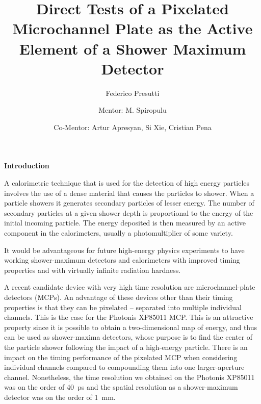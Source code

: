 \documentclass[twocolumn]{article}
\title{Direct Tests of a Pixelated Microchannel Plate as the Active Element of a Shower Maximum Detector}
\author{Federico Presutti
\and Mentor: M. Spiropulu
\and Co-Mentor: Artur Apresyan, Si Xie, Cristian Pena}
\begin{document}



\title{\large}{\textbf{Introduction}}

A calorimetric technique that is used for the detection of high energy particles involves the use of a dense material that causes the particles to shower. When a particle showers it generates secondary particles of lesser energy. The number of secondary particles at a given shower depth is proportional to the energy of the initial incoming particle. The energy deposited is then measured by an active component in the calorimeters, usually a photomultiplier of some variety.

It would be advantageous for future high-energy physics experiments to have working shower-maximum detectors and calorimeters with improved timing properties and with virtually infinite radiation hardness.

A recent candidate device with very high time resolution are microchannel-plate detectors (MCPs). An advantage of these devices other than their timing properties is that they can be pixelated -- separated into multiple individual channels. This is the case for the Photonis XP85011 MCP. This is an attractive property since it is possible to obtain a two-dimensional map of energy, and thus can be used as shower-maxima detectors, whose purpose is to find the center of the particle shower following the impact of a high-energy particle. There is an impact on the timing performance of the pixelated MCP when considering individual channels compared to compounding them into one larger-aperture channel. Nonetheless, the time resolution we obtained on the Photonis XP85011 was on the order of \SI{40}{\pico\second} and the spatial resolution as a shower-maximum detector was on the order of \SI{1}{\milli\meter}.
\end{document}
